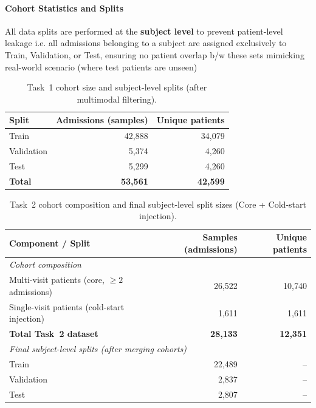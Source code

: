 \paragraph{Cohort Statistics and Splits}
\label{subsec:splits-stats}

All data splits are performed at the \textbf{subject level} to prevent patient-level leakage i.e. all admissions belonging to a subject are assigned exclusively to Train, Validation, or Test, ensuring no patient overlap b/w these sets mimicking real-world scenario (where test patients are unseen)

\begin{table}[t]
\centering
\caption{Task~1 cohort size and subject-level splits (after multimodal filtering).}
\label{tab:task1_splits}
\begin{tabular}{lrr}
\toprule
\textbf{Split} & \textbf{Admissions (samples)} & \textbf{Unique patients} \\
\midrule
Train & 42{,}888 & 34{,}079 \\
Validation & 5{,}374 & 4{,}260 \\
Test & 5{,}299 & 4{,}260 \\
\midrule
\textbf{Total} & \textbf{53{,}561} & \textbf{42{,}599} \\
\bottomrule
\end{tabular}
\end{table}

\begin{table}[t]
\centering
\caption{Task~2 cohort composition and final subject-level split sizes (Core + Cold-start injection).}
\label{tab:task2_stats_splits}
\begin{tabular}{lrr}
\toprule
\textbf{Component / Split} & \textbf{Samples (admissions)} & \textbf{Unique patients} \\
\midrule
\multicolumn{3}{l}{\textit{Cohort composition}} \\
Multi-visit patients (core, $\ge 2$ admissions) & 26{,}522 & 10{,}740 \\
Single-visit patients (cold-start injection) & 1{,}611 & 1{,}611 \\
\midrule
\textbf{Total Task~2 dataset} & \textbf{28{,}133} & \textbf{12{,}351} \\
\midrule
\multicolumn{3}{l}{\textit{Final subject-level splits (after merging cohorts)}} \\
Train & 22{,}489 & -- \\
Validation & 2{,}837 & -- \\
Test & 2{,}807 & -- \\
\bottomrule
\end{tabular}
\end{table}


